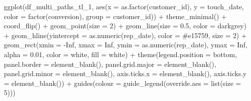 \documentclass[
]{book}
\newenvironment{Shaded}{\begin{snugshade}}{\end{snugshade}}
\newcommand{\AttributeTok}[1]{\textcolor[rgb]{0.77,0.63,0.00}{#1}}
\newcommand{\ConstantTok}[1]{\textcolor[rgb]{0.00,0.00,0.00}{#1}}
\newcommand{\DecValTok}[1]{\textcolor[rgb]{0.00,0.00,0.81}{#1}}
\newcommand{\FloatTok}[1]{\textcolor[rgb]{0.00,0.00,0.81}{#1}}
\newcommand{\FunctionTok}[1]{\textcolor[rgb]{0.00,0.00,0.00}{#1}}
\newcommand{\NormalTok}[1]{#1}
\newcommand{\SpecialCharTok}[1]{\textcolor[rgb]{0.00,0.00,0.00}{#1}}
\newcommand{\StringTok}[1]{\textcolor[rgb]{0.31,0.60,0.02}{#1}}
\begin{document}
\begin{Shaded}
\begin{Highlighting}[]
\FunctionTok{ggplot}\NormalTok{(df\_multi\_paths\_tl\_1, }\FunctionTok{aes}\NormalTok{(}\AttributeTok{x =} \FunctionTok{as.factor}\NormalTok{(customer\_id), }\AttributeTok{y =}\NormalTok{ touch\_date, }\AttributeTok{color =} \FunctionTok{factor}\NormalTok{(conversion), }\AttributeTok{group =}\NormalTok{ customer\_id)) }\SpecialCharTok{+}
        \FunctionTok{theme\_minimal}\NormalTok{() }\SpecialCharTok{+}
        \FunctionTok{coord\_flip}\NormalTok{() }\SpecialCharTok{+}
        \FunctionTok{geom\_point}\NormalTok{(}\AttributeTok{size =} \DecValTok{2}\NormalTok{) }\SpecialCharTok{+}
        \FunctionTok{geom\_line}\NormalTok{(}\AttributeTok{size =} \FloatTok{0.5}\NormalTok{, }\AttributeTok{color =} \StringTok{\textquotesingle{}darkgrey\textquotesingle{}}\NormalTok{) }\SpecialCharTok{+}
        \FunctionTok{geom\_hline}\NormalTok{(}\AttributeTok{yintercept =} \FunctionTok{as.numeric}\NormalTok{(rep\_date), }\AttributeTok{color =} \StringTok{\textquotesingle{}\#e15759\textquotesingle{}}\NormalTok{, }\AttributeTok{size =} \DecValTok{2}\NormalTok{) }\SpecialCharTok{+}
        \FunctionTok{geom\_rect}\NormalTok{(}\AttributeTok{xmin =} \SpecialCharTok{{-}}\ConstantTok{Inf}\NormalTok{, }\AttributeTok{xmax =} \ConstantTok{Inf}\NormalTok{, }\AttributeTok{ymin =} \FunctionTok{as.numeric}\NormalTok{(rep\_date), }\AttributeTok{ymax =} \ConstantTok{Inf}\NormalTok{, }\AttributeTok{alpha =} \FloatTok{0.01}\NormalTok{, }\AttributeTok{color =} \StringTok{\textquotesingle{}white\textquotesingle{}}\NormalTok{, }\AttributeTok{fill =} \StringTok{\textquotesingle{}white\textquotesingle{}}\NormalTok{) }\SpecialCharTok{+}
        \FunctionTok{theme}\NormalTok{(}\AttributeTok{legend.position =} \StringTok{\textquotesingle{}bottom\textquotesingle{}}\NormalTok{,}
              \AttributeTok{panel.border =} \FunctionTok{element\_blank}\NormalTok{(),}
              \AttributeTok{panel.grid.major =} \FunctionTok{element\_blank}\NormalTok{(),}
              \AttributeTok{panel.grid.minor =} \FunctionTok{element\_blank}\NormalTok{(),}
              \AttributeTok{axis.ticks.x =} \FunctionTok{element\_blank}\NormalTok{(),}
              \AttributeTok{axis.ticks.y =} \FunctionTok{element\_blank}\NormalTok{()) }\SpecialCharTok{+}
        \FunctionTok{guides}\NormalTok{(}\AttributeTok{colour =} \FunctionTok{guide\_legend}\NormalTok{(}\AttributeTok{override.aes =} \FunctionTok{list}\NormalTok{(}\AttributeTok{size =} \DecValTok{5}\NormalTok{)))}
\end{Highlighting}
\end{Shaded}
\end{document}
